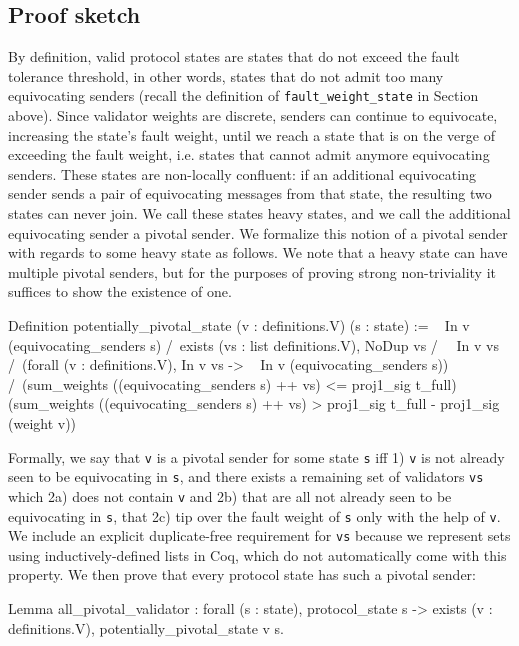 \documentclass[runningheads]{llncs}
\begin{document}
\subsection{Proof sketch} 
By definition, valid protocol states are states that do not exceed the fault tolerance threshold, in other words, states that do not admit too many equivocating senders (recall the definition of \verb|fault_weight_state| in Section \label{sec:formalization} above). Since validator weights are discrete, senders can continue to equivocate, increasing the state's fault weight, until we reach a state that is on the verge of exceeding the fault weight, i.e. states that cannot admit anymore equivocating senders. These states are non-locally confluent: if an additional equivocating sender sends a pair of equivocating messages from that state, the resulting two states can never join. We call these states heavy states, and we call the additional equivocating sender a pivotal sender. We formalize this notion of a pivotal sender with regards to some heavy state as follows. We note that a heavy state can have multiple pivotal senders, but for the purposes of proving strong non-triviality it suffices to show the existence of one.
\begin{coq}
Definition potentially_pivotal_state (v : definitions.V) 
																		 (s : state) :=
	~ In v (equivocating_senders s) /\
	exists (vs : list definitions.V),
	NoDup vs /\
	~ In v vs /\ 
	(forall (v : definitions.V), 
	In v vs -> ~ In v (equivocating_senders s)) /\
	(sum_weights ((equivocating_senders s) ++ vs) 
	<= proj1_sig t_full)%
	(sum_weights ((equivocating_senders s) ++ vs) >
	proj1_sig t_full - proj1_sig (weight v))%
\end{coq}
Formally, we say that \verb|v| is a pivotal sender for some state \verb|s| iff 1) \verb|v| is not already seen to be equivocating in \verb|s|, and there exists a remaining set of validators \verb|vs| which 2a) does not contain \verb|v| and 2b) that are all not already seen to be equivocating in \verb|s|, that 2c) tip over the fault weight of \verb|s| only with the help of \verb|v|. We include an explicit duplicate-free requirement for \verb|vs| because we represent sets using inductively-defined lists in Coq, which do not automatically come with this property. 
We then prove that every protocol state has such a pivotal sender: 
\begin{coq}
Lemma all_pivotal_validator :
	forall (s : state),
	protocol_state s -> 
	exists (v : definitions.V),
	potentially_pivotal_state v s. 
\end{coq}
\end{document}
